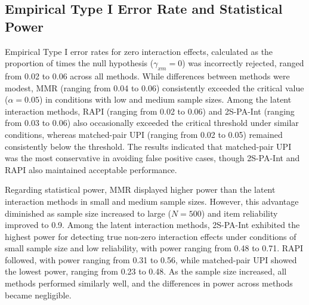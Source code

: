 \documentclass[
  man]{apa6}
\begin{document}
\subsection{Empirical Type I Error Rate and Statistical Power}\label{empirical-type-i-error-rate-and-statistical-power-1}

Empirical Type I error rates for zero interaction effects, calculated as the proportion of times the null hypothesis (\(\gamma_{xm} = 0\)) was incorrectly rejected, ranged from 0.02 to 0.06 across all methods. While differences between methods were modest, MMR (ranging from 0.04 to 0.06) consistently exceeded the critical value (\(\alpha = 0.05\)) in conditions with low and medium sample sizes. Among the latent interaction methods, RAPI (ranging from 0.02 to 0.06) and 2S-PA-Int (ranging from 0.03 to 0.06) also occasionally exceeded the critical threshold under similar conditions, whereas matched-pair UPI (ranging from 0.02 to 0.05) remained consistently below the threshold. The results indicated that matched-pair UPI was the most conservative in avoiding false positive cases, though 2S-PA-Int and RAPI also maintained acceptable performance.

Regarding statistical power, MMR displayed higher power than the latent interaction methods in small and medium sample sizes. However, this advantage diminished as sample size increased to large (\(\textit{N} = 500\)) and item reliability improved to 0.9. Among the latent interaction methods, 2S-PA-Int exhibited the highest power for detecting true non-zero interaction effects under conditions of small sample size and low reliability, with power ranging from 0.48 to 0.71. RAPI followed, with power ranging from 0.31 to 0.56, while matched-pair UPI showed the lowest power, ranging from 0.23 to 0.48. As the sample size increased, all methods performed similarly well, and the differences in power across methods became negligible.
\end{document}
